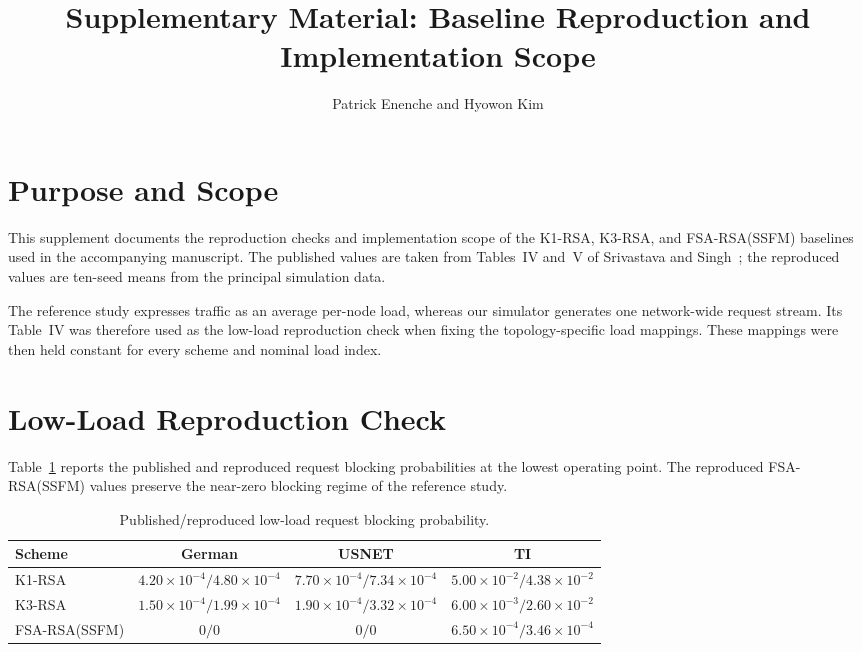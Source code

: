 \documentclass[letterpaper,journal]{IEEEtran}
\begin{document}
\title{Supplementary Material: Baseline Reproduction and Implementation Scope}
\author{Patrick Enenche and Hyowon Kim}
\maketitle

\section{Purpose and Scope}

This supplement documents the reproduction checks and implementation scope of
the K1-RSA, K3-RSA, and FSA-RSA(SSFM) baselines used in the accompanying
manuscript. The published values are taken from Tables~IV and~V of
Srivastava and Singh~\cite{Srivastava2025SSFM}; the reproduced values are
ten-seed means from the principal simulation data.

The reference study expresses traffic as an average per-node load, whereas
our simulator generates one network-wide request stream. Its Table~IV was
therefore used as the low-load reproduction check when fixing the
topology-specific load mappings. These mappings were then held constant for
every scheme and nominal load index.

\section{Low-Load Reproduction Check}

Table~\ref{tab:supp_low_load} reports the published and reproduced request
blocking probabilities at the lowest operating point. The reproduced
FSA-RSA(SSFM) values preserve the near-zero blocking regime of the reference
study.

\begin{table}[t]
\centering
\caption{Published/reproduced low-load request blocking probability.}
\label{tab:supp_low_load}
\scriptsize
\setlength{\tabcolsep}{3.2pt}
\begin{tabular}{lccc}
\toprule
\textbf{Scheme} & \textbf{German} & \textbf{USNET} & \textbf{TI} \\
\midrule
K1-RSA
& \(4.20{\times}10^{-4}/4.80{\times}10^{-4}\)
& \(7.70{\times}10^{-4}/7.34{\times}10^{-4}\)
& \(5.00{\times}10^{-2}/4.38{\times}10^{-2}\) \\
K3-RSA
& \(1.50{\times}10^{-4}/1.99{\times}10^{-4}\)
& \(1.90{\times}10^{-4}/3.32{\times}10^{-4}\)
& \(6.00{\times}10^{-3}/2.60{\times}10^{-2}\) \\
FSA-RSA(SSFM)
& \(0/0\)
& \(0/0\)
& \(6.50{\times}10^{-4}/3.46{\times}10^{-4}\) \\
\bottomrule
\end{tabular}
\end{table}
\end{document}
